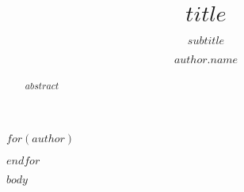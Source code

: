 \documentclass[sigconf,nonacm]{acmart}
\begin{document}
\title{$title$}
\subtitle{$subtitle$}
$for(author)$
  \author{$author.name$}
$endfor$  

\begin{abstract}
$abstract$
\end{abstract}

\maketitle
\onecolumn

$body$



\end{document}
